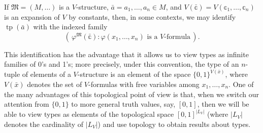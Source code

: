 \documentclass{scrartcl}
\DeclareMathOperator{\tp}{tp}
\newcommand{\FM}{\mathfrak{M}}
\begin{document}
If $\mathfrak{M}=(M,\dots)$ is a $V$-structure, $\bar a= a_1,\dots, a_n\in M$, and $V(\bar{\mathbb{c}})=V(\mathbb{c}_1,\dots, \mathbb{c}_n)$ is an expansion of $V$ by constants, then, in some contexts, we may identify $\tp(\bar a)$ with the indexed family
\[
\left(\,
\varphi^{\FM}(\bar{\mathbb{c}}) \colon \text{$\varphi(x_1,\dots, x_n)$ is a $V$-formula}
\, \right).
\]



This identification has the advantage that it allows us to view types as infinite families of 0's and 1's; more precisely, under this convention, the type of an $n$-tuple of elements of a $V$-structure is an element of the space $\{0,1\}^{V(\bar x)}$, where $V(\bar x)$ denotes the set of $V$-formulas with free variables among $x_1,\dots, x_n$. One of the many advantages of this topological point of view is that, when we switch our attention from $\{0,1\}$ to more general truth values, say, $[0,1]$, then we will be able to view types as elements of the topological space $[0,1]^{|L_V|}$ (where $|L_V|$ denotes the cardinality of $|L_V|$) and use topology to obtain results about types.
\end{document}
